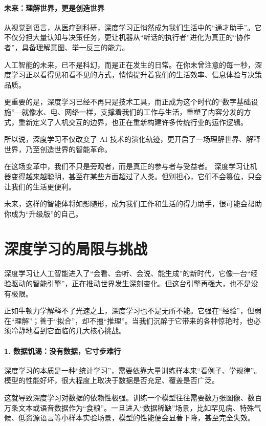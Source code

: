 \paragraph{未来：理解世界，更是创造世界}

从视觉到语言，从医疗到科研，深度学习正悄然成为我们生活中的“通才助手”。它不仅分担大量认知与决策任务，更让机器从“听话的执行者”进化为真正的“协作者”，具备理解意图、举一反三的能力。

人工智能的未来，已不是科幻，而是正在发生的日常。在你未曾注意的每一秒，深度学习正以看得见和看不见的方式，悄悄提升着我们的生活效率、信息体验与决策品质。

更重要的是，深度学习已经不再只是技术工具，而正成为这个时代的“数字基础设施”---就像水、电、网络一样，支撑着我们的工作与生活，重塑了内容分发的方式，重新定义了人机交互的边界，也正在重新构建许多传统行业的运作逻辑。

所以说，深度学习不仅改变了 AI 技术的演化轨迹，更开启了一场理解世界、解释世界，乃至创造世界的智能革命。

在这场变革中，我们不只是旁观者，而是真正的参与者与受益者。
深度学习让机器变得越来越聪明，甚至在某些方面超过了人类。但别担心，它们不会篡位，只会让我们的生活更便利。

未来，这样的智能体将如影随形，成为我们工作和生活的得力助手，很可能会帮助你成为“升级版”的自己。

 \section{深度学习的局限与挑战}  

深度学习让人工智能进入了“会看、会听、会说、能生成”的新时代，它像一台“经验驱动的智能引擎”，正在推动世界发生深刻变化。但这台引擎再强大，也不是没有极限。

正如牛顿力学解释不了光速之上，深度学习也不是无所不能。它强在“经验”，但弱在“理解”；善于“拟合”，却不擅“推理”。当我们沉醉于它带来的各种惊艳时，也必须冷静地看到它面临的几大核心挑战。

\paragraph*{1. 数据饥渴：没有数据，它寸步难行}

深度学习的本质是一种“统计学习”，需要依靠大量训练样本来“看例子、学规律”。模型的性能好坏，很大程度上取决于数据是否充足、覆盖是否广泛。

这就导致深度学习对数据的依赖性极强。训练一个模型往往需要数万张图像、数百万条文本或语音数据作为“食粮”。一旦进入“数据稀缺”场景，比如罕见病、特殊气候、低资源语言等小样本实验场景，模型的性能便会显著下降，甚至完全失效。

